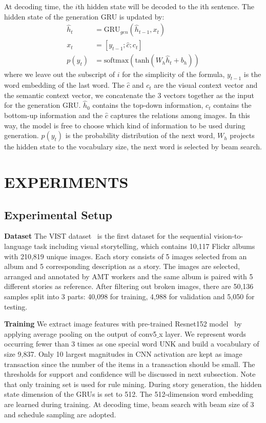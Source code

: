 \documentclass[sigconf]{acmart}
\begin{document}
At decoding time, the $i$th hidden state will be decoded to the ith sentence. The hidden state of the generation GRU is updated by:
\begin{align}
    \hat{h}_t &= \text{GRU}_{gen}(\hat{h}_{t-1}, x_t) \\
    x_t &= [y_{t-1};\hat{c};c_t] \\
    p(y_t) &= \text{softmax}(\text{tanh}(W_h\hat{h}_t+b_h))
\end{align}
where we leave out the subscript of $i$ for the simplicity of the formula, $y_{t-1}$ is the word embedding of the last word. The $\hat{c}$ and $c_t$ are the visual context vector and the semantic context vector, we concatenate the 3 vectors together as the input for the generation GRU. $\hat{h}_0$ contains the top-down information, $c_t$ contains the bottom-up information and the $\hat{c}$ captures the relations among images. In this way, the model is free to choose which kind of information to be used during generation. $p(y_t)$ is the probability distribution of the next word, $W_h$ projects the hidden state to the vocabulary size, the next word is selected by beam search.

\section{EXPERIMENTS}
\subsection{Experimental Setup}

\textbf{Dataset} The VIST dataset~\cite{huang2016visual} is the first dataset for the sequential vision-to-language task including visual storytelling, which contains 10,117 Flickr albums with 210,819 unique images. Each story consists of 5 images selected from an album and 5 corresponding description as a story. The images are selected, arranged and annotated by AMT workers and the same album is paired with 5 different stories as reference. After filtering out broken images, there are 50,136 samples split into 3 parts: 40,098 for training, 4,988 for validation and 5,050 for testing.

\textbf{Training} We extract image features with pre-trained Resnet152 model~\cite{he2016deep} by applying average pooling on the output of conv5$\_$x layer.  We represent words occurring fewer than 3 times as one special word UNK and build a vocabulary of size 9,837. Only 10 largest magnitudes in CNN activation are kept as image transaction since the number of the items in a transaction should be small. The thresholds for support and confidence will be discussed in next subsection. Note that only training set is used for rule mining. During story generation, the hidden state dimension of the GRUs is set to 512. The 512-dimension word embedding are learned during training. At decoding time, beam search with beam size of 3 and schedule sampling\cite{bengio2015scheduled} are adopted.
\end{document}
